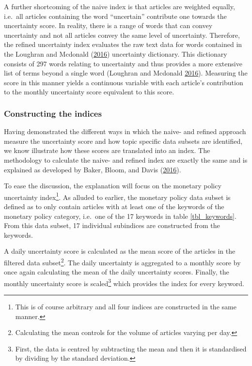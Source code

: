 \documentclass[11pt,preprint, authoryear]{elsarticle}
\numberwithin{equation}{section}
\numberwithin{figure}{section}
\numberwithin{table}{section}
\let\rmarkdownfootnote\footnote%
\def\footnote{\protect\rmarkdownfootnote}
\begin{document}
A further shortcoming of the naive index is that articles are weighted
equally, i.e.~all articles containing the word ``uncertain'' contribute
one towards the uncertainty score. In reality, there is a range of words
that can convey uncertainty and not all articles convey the same level
of uncertainty. Therefore, the refined uncertainty index evaluates the
raw text data for words contained in the Loughran and Mcdonald
(\protect\hyperlink{ref-Loughran2016}{2016}) uncertainty dictionary.
This dictionary consists of 297 words relating to uncertainty and thus
provides a more extensive list of terms beyond a single word (Loughran and Mcdonald
\protect\hyperlink{ref-Loughran2016}{2016}). Measuring the score in this
manner yields a continuous variable with each article's contribution to
the monthly uncertainty score equivalent to this score.


\subsubsection{\texorpdfstring{Constructing the indices
\label{ss_indices}}{Constructing the indices }}\label{constructing-the-indices}

Having demonstrated the different ways in which the naive- and refined
approach measure the uncertainty score and how topic specific data
subsets are identified, we know illustrate how these scores are translated
into an index. The methodology to calculate the naive- and
refined index are exactly the same and is explained as developed by Baker, Bloom, and Davis
(\protect\hyperlink{ref-Baker2016}{2016}).

To ease the discussion, the explanation will focus on the monetary
policy uncertainty index\footnote{This is of course arbitrary and all
  four indices are constructed in the same manner.}. As alluded to
earlier, the monetary policy data subset is defined as to only contain articles with at least one of the keywords of the monetary policy
category, i.e.~one of the 17 keywords in table \ref{tbl_keywords}. From
this data subset, 17 individual subindices are constructed from the keywords. %

A daily uncertainty score is calculated as the mean score of the
articles in the filtered data subset\footnote{Calculating the mean
  controls for the volume of articles varying per day.}. The daily
uncertainty is aggregated to a monthly score by once again calculating
the mean of the daily uncertainty scores. Finally, the monthly
uncertainty score is scaled\footnote{First, the data is centred by subtracting the mean and then it is standardised by dividing by the standard deviation.} which provides the index for every keyword.
\end{document}
